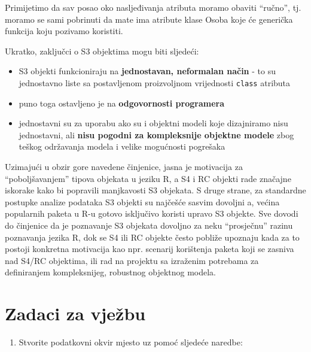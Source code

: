 \documentclass[]{book}
\providecommand{\tightlist}{%
  \setlength{\itemsep}{0pt}\setlength{\parskip}{0pt}}
\theoremstyle{definition}
\theoremstyle{definition}
\theoremstyle{definition}
\theoremstyle{remark}
\begin{document}
Primijetimo da sav posao oko nasljeđivanja atributa moramo obaviti
``ručno'', tj. moramo se sami pobrinuti da mate ima atribute klase Osoba
koje će generička funkcija koju pozivamo koristiti.

Ukratko, zaključci o S3 objektima mogu biti sljedeći:

\begin{itemize}
\tightlist
\item
  S3 objekti funkcioniraju na \textbf{jednostavan, neformalan način} -
  to su jednostavno liste sa postavljenom proizvoljnom vrijednosti
  \texttt{class} atributa
\item
  puno toga ostavljeno je na \textbf{odgovornosti programera}
\item
  jednostavni su za uporabu ako su i objektni modeli koje dizajniramo
  nisu jednostavni, ali \textbf{nisu pogodni za kompleksnije objektne
  modele} zbog teškog održavanja modela i velike mogućnosti pogrešaka
\end{itemize}

Uzimajući u obzir gore navedene činjenice, jasna je motivacija za
``poboljšavanjem'' tipova objekata u jeziku R, a S4 i RC objekti rade
značajne iskorake kako bi popravili manjkavosti S3 objekata. S druge
strane, za standardne postupke analize podataka S3 objekti su najčešće
sasvim dovoljni a, većina popularnih paketa u R-u gotovo isključivo
koristi upravo S3 objekte. Sve dovodi do činjenice da je poznavanje S3
objekata dovoljno za neku ``prosječnu'' razinu poznavanja jezika R, dok
se S4 ili RC objekte često pobliže upoznaju kada za to postoji konkretna
motivacija kao npr. scenarij korištenja paketa koji se zasniva nad S4/RC
objektima, ili rad na projektu sa izraženim potrebama za definiranjem
kompleksnijeg, robustnog objektnog modela.

\section*{Zadaci za vježbu}\label{zadaci-za-vjezbu-3}

\begin{enumerate}
\def\labelenumi{\arabic{enumi}.}
\tightlist
\item
  Stvorite podatkovni okvir mjesto uz pomoć sljedeće naredbe:
\end{enumerate}
\end{document}
